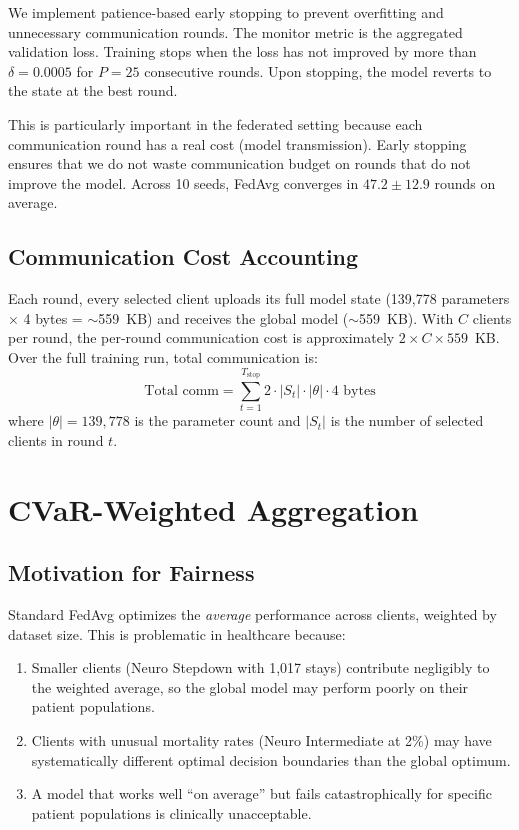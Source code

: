 \documentclass[11pt,a4paper]{report}
\begin{document}
We implement patience-based early stopping to prevent overfitting and unnecessary communication rounds. The monitor metric is the aggregated validation loss. Training stops when the loss has not improved by more than $\delta = 0.0005$ for $P = 25$ consecutive rounds. Upon stopping, the model reverts to the state at the best round.

This is particularly important in the federated setting because each communication round has a real cost (model transmission). Early stopping ensures that we do not waste communication budget on rounds that do not improve the model. Across 10 seeds, FedAvg converges in $47.2 \pm 12.9$ rounds on average.

\section{Communication Cost Accounting}

Each round, every selected client uploads its full model state (139,778 parameters $\times$ 4 bytes = $\sim$559~KB) and receives the global model ($\sim$559~KB). With $C$ clients per round, the per-round communication cost is approximately $2 \times C \times 559$~KB. Over the full training run, total communication is:
\begin{equation}
\text{Total comm} = \sum_{t=1}^{T_{\text{stop}}} 2 \cdot |S_t| \cdot |\theta| \cdot 4 \text{ bytes}
\end{equation}
where $|\theta| = 139{,}778$ is the parameter count and $|S_t|$ is the number of selected clients in round $t$.


\chapter{CVaR-Weighted Aggregation}

\section{Motivation for Fairness}

Standard FedAvg optimizes the \emph{average} performance across clients, weighted by dataset size. This is problematic in healthcare because:
\begin{enumerate}[leftmargin=2em]
\item Smaller clients (Neuro Stepdown with 1,017 stays) contribute negligibly to the weighted average, so the global model may perform poorly on their patient populations.
\item Clients with unusual mortality rates (Neuro Intermediate at 2\%) may have systematically different optimal decision boundaries than the global optimum.
\item A model that works well ``on average'' but fails catastrophically for specific patient populations is clinically unacceptable.
\end{enumerate}
\end{document}
